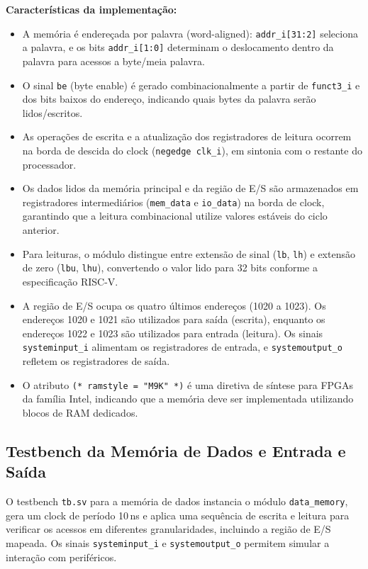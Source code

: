 \documentclass[
	12pt,				%
	oneside,
	a4paper,			%
	english,			%
	french,				%
	spanish,			%
	brazil,				%
	]{abntex2}
\begin{document}
\textbf{Características da implementação:}
\begin{itemize}
  \item A memória é endereçada por palavra (word-aligned): \texttt{addr\_i[31:2]} seleciona a palavra, e os bits \texttt{addr\_i[1:0]} determinam o deslocamento dentro da palavra para acessos a byte/meia palavra.
  \item O sinal \texttt{be} (byte enable) é gerado combinacionalmente a partir de \texttt{funct3\_i} e dos bits baixos do endereço, indicando quais bytes da palavra serão lidos/escritos.
  \item As operações de escrita e a atualização dos registradores de leitura ocorrem na borda de descida do clock (\texttt{negedge clk\_i}), em sintonia com o restante do processador.
  \item Os dados lidos da memória principal e da região de E/S são armazenados em registradores intermediários (\texttt{mem\_data} e \texttt{io\_data}) na borda de clock, garantindo que a leitura combinacional utilize valores estáveis do ciclo anterior.
  \item Para leituras, o módulo distingue entre extensão de sinal (\texttt{lb}, \texttt{lh}) e extensão de zero (\texttt{lbu}, \texttt{lhu}), convertendo o valor lido para 32 bits conforme a especificação RISC-V.
  \item A região de E/S ocupa os quatro últimos endereços (1020 a 1023). Os endereços 1020 e 1021 são utilizados para saída (escrita), enquanto os endereços 1022 e 1023 são utilizados para entrada (leitura). Os sinais \texttt{systeminput\_i} alimentam os registradores de entrada, e \texttt{systemoutput\_o} refletem os registradores de saída.
  \item O atributo \texttt{(* ramstyle = "M9K" *)} é uma diretiva de síntese para FPGAs da família Intel, indicando que a memória deve ser implementada utilizando blocos de RAM dedicados.
\end{itemize}

\subsection{Testbench da Memória de Dados e Entrada e Saída}

O testbench \texttt{tb.sv} para a memória de dados instancia o módulo \texttt{data\_memory}, gera um clock de período 10\,ns e aplica uma sequência de escrita e leitura para verificar os acessos em diferentes granularidades, incluindo a região de E/S mapeada. Os sinais \texttt{systeminput\_i} e \texttt{systemoutput\_o} permitem simular a interação com periféricos.
\end{document}
